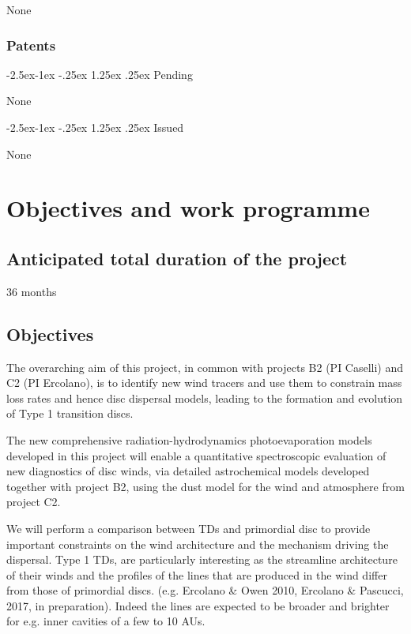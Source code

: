 \documentclass[10pt,fleqn,twoside]{article}
\makeatletter
\newcommand{\Tcol}{\color{blue}}
\renewcommand\paragraph{\@startsection{paragraph}{4}{\z@}%
            {-2.5ex\@plus -1ex \@minus -.25ex}%
            {1.25ex \@plus .25ex}%
            {\normalfont\normalsize\bfseries}}
\makeatother
\begin{document}
None 
\subsubsection{\Tcol Patents}

\paragraph{\Tcol Pending}

None

\paragraph{\Tcol Issued}

None

\section{\Tcol Objectives and work programme}
\renewcommand{\leftmark}{\sc Objectives and work programme}


\subsection{\Tcol Anticipated total duration of the project}

36 months

\subsection{\Tcol Objectives}


The overarching aim of this project, in common with projects B2 (PI
Caselli) and C2 (PI Ercolano),
is to identify new wind tracers and use them to constrain mass loss rates and hence
disc dispersal models, leading to the formation and evolution of Type 1
transition discs. 

The new comprehensive radiation-hydrodynamics photoevaporation models
developed in this project will enable a quantitative
spectroscopic evaluation of new diagnostics of disc winds, via
detailed astrochemical models developed together with project B2,
using the dust model for the wind and atmosphere from project C2. 

We will perform a comparison between TDs and
primordial disc to provide important constraints on the wind
architecture and the mechanism driving the dispersal. 
Type 1 TDs, are particularly interesting as the streamline architecture of their winds
and the profiles of the lines that are produced in the wind
differ from those of primordial discs. (e.g. Ercolano \& Owen
2010, Ercolano \& Pascucci, 2017, in preparation). Indeed the lines
are expected to be broader and brighter for e.g. inner cavities of a few to 10 AUs.  
\end{document}
